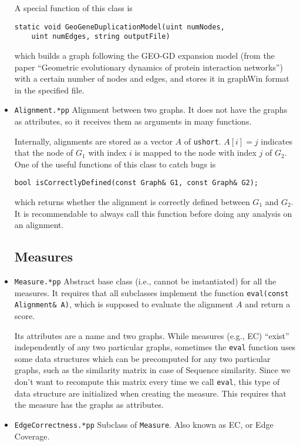 \documentclass[]{article}
\begin{document}
\begin{itemize}
A special function of this class is
\begin{verbatim}
static void GeoGeneDuplicationModel(uint numNodes,
    uint numEdges, string outputFile)
\end{verbatim}
which builds a graph following the GEO-GD expansion model (from the paper ``Geometric evolutionary dynamics of protein interaction networks'') with a certain number of nodes and edges, and stores it in graphWin format in the specified file.

\item \texttt{Alignment.*pp} Alignment between two graphs. It does not have the graphs as attributes, so it receives them as arguments in many functions.

Internally, alignments are stored as a vector $A$ of \texttt{ushort}. $A[i]=j$ indicates that the node of $G_1$ with index $i$ is mapped to the node with index $j$ of $G_2$.
One of the useful functions of this class to catch bugs is
\begin{verbatim}
bool isCorrectlyDefined(const Graph& G1, const Graph& G2);
\end{verbatim}
which returns whether the alignment is correctly defined between $G_1$ and $G_2$. It is recommendable to always call this function before doing any analysis on an alignment.

\subsection{Measures}

\item \texttt{Measure.*pp} Abstract base class (i.e., cannot be instantiated) for all the measures. It requires that all subclasses implement the function \texttt{eval(const Alignment\& A)}, which is supposed to evaluate the alignment $A$ and return a score.

Its attributes are a name and two graphs. While measures (e.g., EC) ``exist'' independently of any two particular graphs, sometimes the \texttt{eval} function uses some data structures which can be precomputed for any two particular graphs, such as the similarity matrix in case of Sequence similarity. Since we don't want to recompute this matrix every time we call \texttt{eval}, this type of data structure are initialized when creating the measure. This requires that the measure has the graphs as attributes.

\item \texttt{EdgeCorrectness.*pp} Subclass of \texttt{Measure}. Also known as EC, or Edge Coverage.


\end{itemize}
\end{document}
